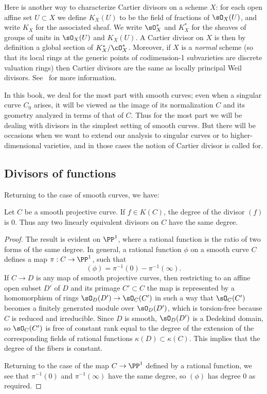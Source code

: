 Here is another way to characterize Cartier divisors on a scheme $X$: for each open affine set $U\subset X$ we define $K_X(U)$ to be the field of fractions of $\sO_X(U)$, and write $K_X$ for the
%
%
%
associated sheaf. We write $\sO_X^*$ and $K_X^*$ for the sheaves of groups of units in $\sO_X(U)$ and $K_X(U)$.
A Cartier divisor on $X$ is then by definition a global section of $K_X^*/\cO_X^*$.
Moreover, if $X$ is a
\emph{normal} scheme
(so that its local rings at
%
the generic points of codimension-1 subvarieties are discrete
valuation rings) then Cartier divisors are the same as locally
principal Weil divisors. See~\cite[Section II.6]{Hartshorne1977} for
more information.

In this book, we
deal
for the most part with smooth curves;
even when a singular curve $C_{0}$ arises, it will be viewed as the image of its normalization
$C$
and its geometry
analyzed in terms of that of $C$. Thus for the most part we will
be dealing with divisors in the simplest setting of smooth curves. But
there will be occasions when we want to extend our analysis to
singular curves
or to
higher-dimensional varieties, and in those
cases the notion of Cartier divisor is called for.

\subsection*{Divisors of functions}

Returning to the case of smooth curves, we have:

\begin{theorem}\label{degree defn}
Let $C$ be a smooth projective curve. If $f\in K(C)$,
the degree of the divisor $(f)$ is $0$.
Thus any two linearly equivalent divisors on $C$ have the
same degree.
\end{theorem}

\begin{proof}
 The result is evident on $\PP^1$, where a rational
function is the ratio of two forms of the same degree. In general, a rational function $\phi$ on a smooth curve $C$ defines a map $\pi : C \to \PP^1$, such that
$$
(\phi) = \pi^{-1}(0) - \pi^{-1}(\infty).
$$
If $C\to D$ is any map of smooth projective curves, then restricting to an affine open subset $D'$ of $D$ and its primage
$C'\subset C$
the map is represented by a homomorphism of rings $\sO_D(D') \to \sO_C(C')$ in such a way that $\sO_C(C')$ becomes a finitely generated
module over $\sO_D(D')$, which is torsion-free because $C$ is reduced and irreducible. Since $D$ is smooth,
$\sO_D(D')$ is a Dedekind domain, so $\sO_C(C')$ is free of constant rank equal to the degree of the extension of the corresponding
 fields of rational functions $\kappa(D)\subset \kappa(C)$. This implies that the degree of the fibers is constant.

 Returning to the case of the map $C\to \PP^1$ defined by a rational function, we see that $\pi^{-1}(0)$ and $ \pi^{-1}(\infty)$
 have the same degree, so $(\phi)$ has degree 0 as required.
\end{proof}

